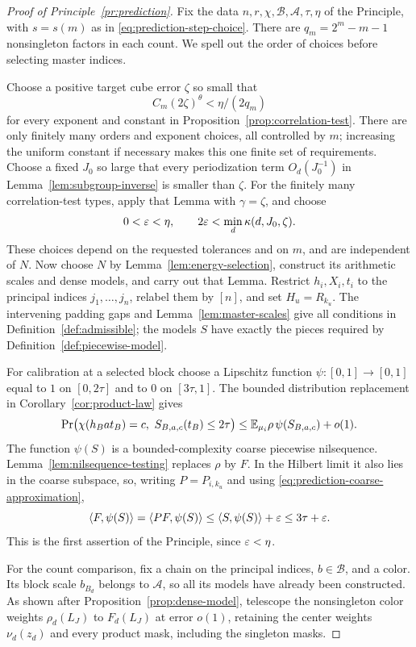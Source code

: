 \begin{proof}[Proof of Principle~\ref{pr:prediction}]
Fix the data $n,r,\chi,\mathcal B,\mathcal A,\tau,\eta$ of the
Principle, with $s=s(m)$ as in
\eqref{eq:prediction-step-choice}.  There are
$q_m=2^m-m-1$ nonsingleton factors in each count.  We spell out the
order of choices before selecting master indices.

Choose a positive target cube error $\zeta$ so small that
\[
 C_m(2\zeta)^\theta<\eta/(2q_m)
\]
for every exponent and constant in
Proposition~\ref{prop:correlation-test}.  There are only finitely
many orders and exponent choices, all controlled by $m$; increasing
the uniform constant if necessary makes this one finite set of
requirements.  Choose a fixed $J_0$ so large that every
periodization term $O_d(J_0^{-1})$ in
Lemma~\ref{lem:subgroup-inverse} is smaller than $\zeta$.
For the finitely many correlation-test types, apply that Lemma with
$\gamma=\zeta$, and choose
\[
 0<\varepsilon<\eta,
 \qquad 2\varepsilon<\min_d\kappa(d,J_0,\zeta).
\]
These choices depend on the requested tolerances and on $m$,
and are independent of $N$.  Now choose $N$ by
Lemma~\ref{lem:energy-selection}, construct its arithmetic scales
and dense models, and carry out that Lemma.  Restrict $h_i,X_i,t_i$
to the principal indices $j_1,\ldots,j_n$, relabel them by $[n]$,
and set $H_u=R_{k_u}$.  The intervening padding gaps and
Lemma~\ref{lem:master-scales} give all conditions in
Definition~\ref{def:admissible}; the models $S$ have exactly the
pieces required by Definition~\ref{def:piecewise-model}.

For calibration at a selected block choose a Lipschitz function
$\psi:[0,1]\to[0,1]$ equal to $1$ on $[0,2\tau]$ and to $0$ on
$[3\tau,1]$.  The bounded distribution replacement in
Corollary~\ref{cor:product-law} gives
\[
 \Pr\bigl(\chi(h_Bat_B)=c,\ S_{B,a,c}(t_B)\leq2\tau\bigr)
 \leq\E_{\mu_i}\rho\,\psi(S_{B,a,c})+o(1).
\]
The function $\psi(S)$ is a bounded-complexity coarse piecewise
nilsequence.  Lemma~\ref{lem:nilsequence-testing} replaces $\rho$
by $F$.  In the Hilbert limit it also lies in the coarse subspace,
so, writing $P=P_{i,k_u}$ and using
\eqref{eq:prediction-coarse-approximation},
\[
 \langle F,\psi(S)\rangle
 =\langle PF,\psi(S)\rangle
 \leq\langle S,\psi(S)\rangle+\varepsilon
 \leq3\tau+\varepsilon.
\]
This is the first assertion of the Principle, since $\varepsilon<\eta$.

For the count comparison, fix a chain on the principal indices,
$b\in\mathcal B$, and a color.  Its block scale $b_{B_d}$ belongs
to $\mathcal A$, so all its models have already been constructed.
As shown after Proposition~\ref{prop:dense-model}, telescope the
nonsingleton color weights $\rho_d(L_J)$ to $F_d(L_J)$ at error
$o(1)$, retaining the center weights $\nu_d(z_d)$ and every product
mask, including the singleton masks.


\end{proof}
